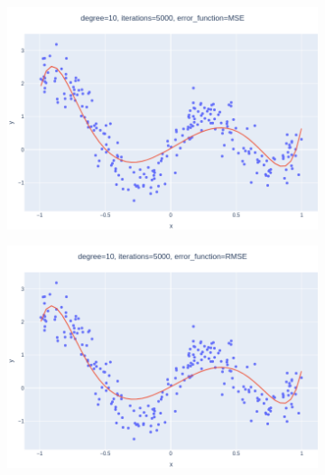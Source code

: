 \documentclass[14pt,a4]{article}
\begin{document}
\begin{figure}[h]
\begin{subfigure}{0.3\textwidth}
        \includegraphics[width=\textwidth]{images/implementation/q1/part_c/10_5000_MSE.png}
    \end{subfigure}
    \hfill
    \begin{subfigure}{0.3\linewidth}
        \centering
        \includegraphics[width=\textwidth]{images/implementation/q1/part_c/10_5000_RMSE.png}
    \end{subfigure}
    \newline
    \begin{subfigure}{0.3\linewidth}
        \centering

\end{subfigure}
\end{figure}
\end{document}
